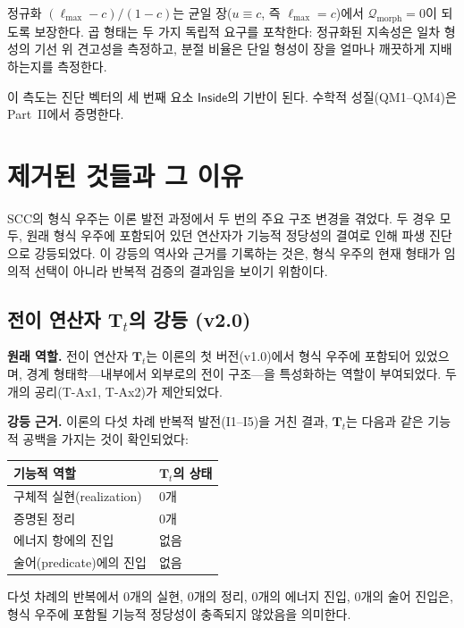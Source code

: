 정규화 $(\ell_{\max} - c)/(1-c)$는 균일 장($u \equiv c$, 즉 $\ell_{\max} = c$)에서 $\mathcal{Q}_{\mathrm{morph}} = 0$이 되도록 보장한다. 곱 형태는 두 가지 독립적 요구를 포착한다: 정규화된 지속성은 일차 형성의 기선 위 견고성을 측정하고, 분절 비율은 단일 형성이 장을 얼마나 깨끗하게 지배하는지를 측정한다.

이 측도는 진단 벡터의 세 번째 요소 $\mathsf{Inside}$의 기반이 된다. 수학적 성질(QM1--QM4)은 Part~II에서 증명한다.


\section{제거된 것들과 그 이유}
\label{sec:what-was-removed}

SCC의 형식 우주는 이론 발전 과정에서 두 번의 주요 구조 변경을 겪었다. 두 경우 모두, 원래 형식 우주에 포함되어 있던 연산자가 기능적 정당성의 결여로 인해 파생 진단으로 강등되었다. 이 강등의 역사와 근거를 기록하는 것은, 형식 우주의 현재 형태가 임의적 선택이 아니라 반복적 검증의 결과임을 보이기 위함이다.


\subsection{전이 연산자 $\mathbf{T}_t$의 강등 (v2.0)}

\textbf{원래 역할.} 전이 연산자 $\mathbf{T}_t$는 이론의 첫 버전(v1.0)에서 형식 우주에 포함되어 있었으며, 경계 형태학---내부에서 외부로의 전이 구조---을 특성화하는 역할이 부여되었다. 두 개의 공리(T-Ax1, T-Ax2)가 제안되었다.

\textbf{강등 근거.} 이론의 다섯 차례 반복적 발전(I1--I5)을 거친 결과, $\mathbf{T}_t$는 다음과 같은 기능적 공백을 가지는 것이 확인되었다:

\begin{center}
\begin{tabular}{ll}
\hline
\textbf{기능적 역할} & \textbf{$\mathbf{T}_t$의 상태} \\
\hline
구체적 실현(realization) & 0개 \\
증명된 정리 & 0개 \\
에너지 항에의 진입 & 없음 \\
술어(predicate)에의 진입 & 없음 \\
\hline
\end{tabular}
\end{center}

다섯 차례의 반복에서 0개의 실현, 0개의 정리, 0개의 에너지 진입, 0개의 술어 진입은, 형식 우주에 포함될 기능적 정당성이 충족되지 않았음을 의미한다.

